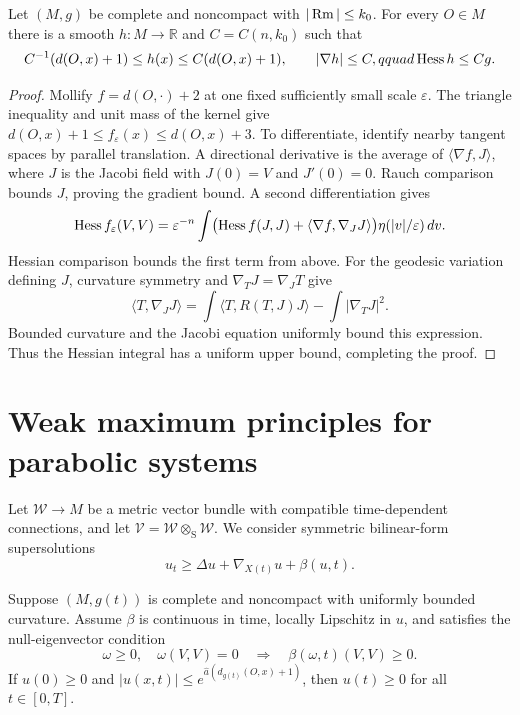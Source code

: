 \begin{lemma}
\label{lem:bounded-curvature-distance-like-function}

Let $(M,g)$ be complete and noncompact with $|\operatorname{Rm}|\leq k_0$.  For every
$O\in M$ there is a smooth $h:M\to\mathbb R$ and $C=C(n,k_0)$ such that
\[
C^{-1}(d(O,x)+1)\leq h(x)\leq C(d(O,x)+1),
\qquad |\nabla h|\leq C,qquad \operatorname{Hess} h\leq Cg.
\]
\end{lemma}

\begin{proof}
\sketch
{}
Mollify $f=d(O,\cdot)+2$ at one fixed sufficiently small scale
$\varepsilon$.  The triangle inequality and unit mass of the kernel give
$d(O,x)+1\leq f_\varepsilon(x)\leq d(O,x)+3$.  To differentiate, identify
nearby tangent spaces by parallel translation.  A directional derivative is
the average of $\langle\nabla f,J\rangle$, where $J$ is the Jacobi field with
$J(0)=V$ and $J'(0)=0$.  Rauch comparison bounds $J$, proving the gradient
bound.  A second differentiation gives
\[
\operatorname{Hess} f_\varepsilon(V,V)=\varepsilon^{-n}\int
\bigl(\operatorname{Hess} f(J,J)+\langle\nabla f,\nabla_JJ\rangle\bigr)
\eta(|v|/\varepsilon)\,dv.
\]
Hessian comparison bounds the first term from above.  For the geodesic
variation defining $J$, curvature symmetry and $\nabla_TJ=\nabla_JT$ give
\[
\langle T,\nabla_JJ\rangle
=\int\langle T,R(T,J)J\rangle-\int|\nabla_TJ|^2.
\]
Bounded curvature and the Jacobi equation uniformly bound this expression.
Thus the Hessian integral has a uniform upper bound, completing the proof.
\end{proof}
\section{Weak maximum principles for parabolic systems}

Let $\mathcal W\to M$ be a metric vector bundle with compatible
time-dependent connections, and let
$\mathcal V=\mathcal W\otimes_{\mathrm S}\mathcal W$.  We consider symmetric
bilinear-form supersolutions
\[
u_t\geq\Delta u+\nabla_{X(t)}u+\beta(u,t).
\]

\begin{proposition}
\label{prop:noncompact-system-preserves-nonnegativity}

Suppose $(M,g(t))$ is complete and noncompact with uniformly bounded
curvature.  Assume $\beta$ is continuous in time, locally Lipschitz in $u$,
and satisfies the null-eigenvector condition
\[
\omega\geq0,\quad \omega(V,V)=0
\quad\Longrightarrow\quad \beta(\omega,t)(V,V)\geq0.
\]
If $u(0)\geq0$ and
$|u(x,t)|\leq e^{\widehat a(d_{g(t)}(O,x)+1)}$, then $u(t)\geq0$ for all
$t\in[0,T]$.
\end{proposition}

